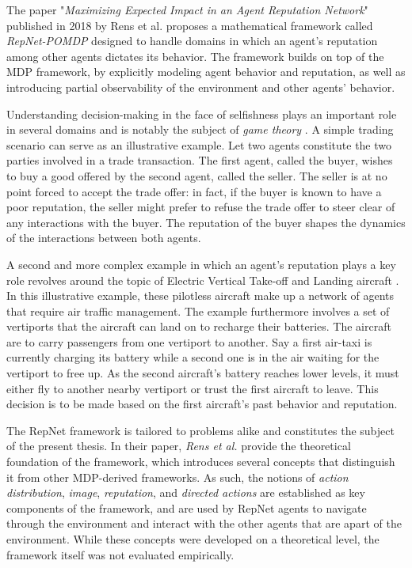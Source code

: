 The paper "\textit{Maximizing Expected Impact in an Agent Reputation Network}" published in 2018 by Rens et al. \cite{rensetal} proposes a mathematical framework called \textit{RepNet-POMDP} designed to handle domains in which an agent's reputation among other agents dictates its behavior. The framework builds on top of the MDP framework, by explicitly modeling agent behavior and reputation, as well as introducing partial observability of the environment and other agents' behavior. 

Understanding decision-making in the face of selfishness plays an important role in several domains and is notably the subject of \textit{game theory} \cite{repp}. A simple trading scenario can serve as an illustrative example. Let two agents constitute the two parties involved in a trade transaction. The first agent, called the buyer, wishes to buy a good offered by the second agent, called the seller. The seller is at no point forced to accept the trade offer: in fact, if the buyer is known to have a poor reputation, the seller might prefer to refuse the trade offer to steer clear of any interactions with the buyer. The reputation of the buyer shapes the dynamics of the interactions between both agents.

A second and more complex example in which an agent's reputation plays a key role revolves around the topic of Electric Vertical Take-off and Landing aircraft \cite{vtol}. In this illustrative example, these pilotless aircraft make up a network of agents that require air traffic management.
The example furthermore involves a set of vertiports that the aircraft can land on to recharge their batteries. The aircraft are to carry passengers from one vertiport to another. Say a first air-taxi is currently charging its battery while a second one is in the air waiting for the vertiport to free up. As the second aircraft's battery reaches lower levels, it must either fly to another nearby vertiport or trust the first aircraft to leave. This decision is to be made based on the first aircraft's past behavior and reputation.

The RepNet framework is tailored to problems alike and constitutes the subject of the present thesis. In their paper, \textit{Rens et al.} provide the theoretical foundation of the framework, which introduces several concepts that distinguish it from other MDP-derived frameworks. As such, the notions of \textit{action distribution}, \textit{image}, \textit{reputation}, and \textit{directed actions} are established as key components of the framework, and are used by RepNet agents to navigate through the environment and interact with the other agents that are apart of the environment. While these concepts were developed on a theoretical level, the framework itself was not evaluated empirically.

